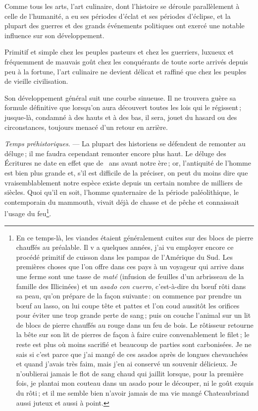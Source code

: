 \sk

Comme tous les arts, l'art culinaire, dont l'histoire se déroule parallèlement à
celle de l'humanité, a eu ses périodes d'éclat et ses périodes d’éclipse, et la
plupart des guerres et des grands événements politiques ont exercé une notable
influence sur son développement.

Primitif et simple chez les peuples pasteurs et chez les guerriers, luxueux et
fréquemment de mauvais goût chez les conquérants de toute sorte arrivés depuis
peu à la fortune, l'art culinaire ne devient délicat et raffiné que chez les
peuples de vieille civilisation.

Son développement général suit une courbe sinueuse. Il ne trouvera guère sa
formule définitive que lorsqu'on aura découvert toutes les lois qui le
régissent ; jusque-là, condamné à des hauts et à des bas, il sera, jouet du
hasard ou des circonstances, toujours menacé d'un retour en arrière.

\sk

\textit{Temps préhistoriques}. — La plupart des historiens se défendent de
remonter au déluge ; il me faudra cependant remonter encore plus haut. Le
déluge des Écritures ne date en effet que de {\mmm} {\mmm} ans
avant notre ère ; or, l'antiquité de l'homme est bien plus grande et, s'il est
difficile de la préciser, on peut du moins dire que vraisemblablement notre
espèce existe depuis un certain nombre de milliers de siècles. Quoi qu'il en
soit, l'homme quaternaire de la période paléolithique, le contemporain du
mammouth, vivait déjà de chasse et de pêche et connaissait l'usage du
feu\footnote{\label{pg0013} \hypertarget{p0013}{En ce temps-là}, les viandes étaient
généralement cuites sur des blocs de pierre chauffés au préalable. \protect Il
v a quelques années, j'ai vu employer encore ce procédé primitif de cuisson
dans les pampas de l'Amérique du Sud. Les premières choses que l'on offre dans
ces pays à un voyageur qui arrive dans une ferme sont une tasse de
\textit{maté} (infusion de feuilles d'un arbrisseau de la famille des
Illicinées) et un \textit{asado con cuerro}, c'est-à-dire du bœuf rôti dans sa
peau, qu'on prépare de la façon suivante : on commence par prendre un bœuf au
lasso, on lui coupe tête et pattes et l'on coud aussitôt les orifices pour
éviter une trop grande perte de sang ; puis on couche l'animal sur un lit de
blocs de pierre chauffés au rouge dans un feu de bois. Le rôtisseur retourne la
bête sur son lit de pierres de façon à faire cuire convenablement le filet ; le
reste est plus où moins sacrifié et beaucoup de parties sont carbonisées. Je ne
sais si c'est parce que j'ai mangé de ces asados après de longues chevauchées
et quand j'avais très faim, mais j'en ai conservé un souvenir délicieux. Je
n'oublierai jamais le flot de sang chaud qui jaillit lorsque, pour la première
fois, je plantai mon couteau dans un asado pour le découper, ni le goût exquis
du rôti ; et il me semble bien n'avoir jamais de ma vie mangé Chateaubriand
aussi juteux et aussi à point.}.
  
